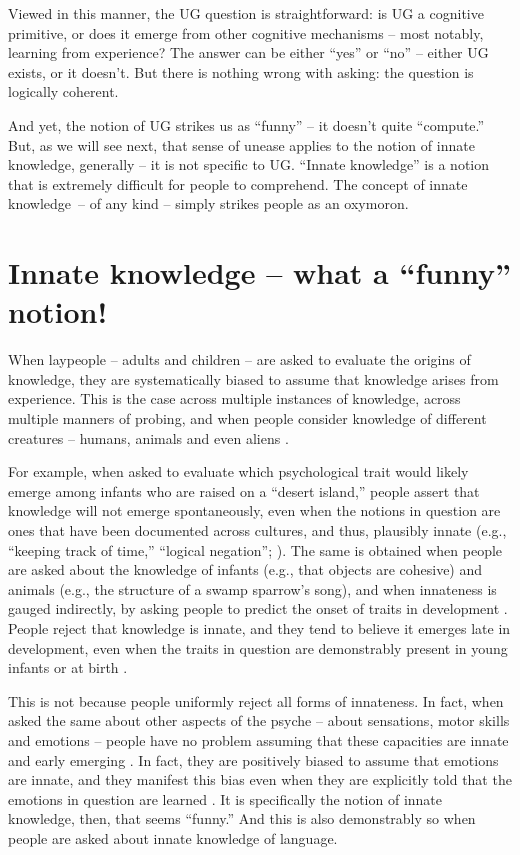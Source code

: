 \documentclass[output=paper,colorlinks,citecolor=brown
]{langscibook}
\begin{document}
Viewed in this manner, the UG question is straightforward: is UG a cognitive primitive, or does it emerge from other cognitive mechanisms -- most notably, learning from experience?
The answer can be either “yes” or “no” -- either UG exists, or it doesn’t. But there is nothing wrong with asking: the question is logically coherent. 

And yet, the notion of UG strikes us as ``funny'' -- it doesn’t quite ``compute.'' But, as we will see next, that sense of unease applies to the notion of innate knowledge, generally -- it is not specific to UG. ``Innate knowledge'' is a notion that is extremely difficult for people to comprehend. The concept of innate knowledge~-- of any kind -- simply strikes people as an oxymoron.

\section{Innate knowledge -- what a “funny” notion!}

When laypeople -- adults and children -- are asked to evaluate the origins of knowledge, they are systematically biased to assume that knowledge arises from experience. This is the case across multiple instances of knowledge, across multiple manners of probing, and when people consider knowledge of different creatures -- humans, animals and even aliens \citep{berent2019people,wang2019empiricism}.

For example, when asked to evaluate which psychological trait would likely emerge among infants who are raised on a “desert island,” people assert that knowledge will not emerge spontaneously, even when the notions in question are ones that have been documented across cultures, and thus, plausibly innate (e.g., “keeping track of time,” “logical negation”; \cite{berent2019people}). The same is obtained when people are asked about the knowledge of infants (e.g., that objects are cohesive) and animals (e.g., the structure of a swamp sparrow’s song), and when innateness is gauged indirectly, by asking people to predict the onset of traits in development \citep{berent2019people}. People reject that knowledge is innate, and they tend to believe it emerges late in development, even when the traits in question are demonstrably present in young infants or at birth \citep{wang2019empiricism}.

This is not because people uniformly reject all forms of innateness. In fact, when asked the same about other aspects of the psyche -- about sensations, motor skills and emotions -- people have no problem assuming that these capacities are innate and early emerging \citep{berent2019people}. In fact, they are positively biased to assume that emotions are innate, and they manifest this bias even when they are explicitly told that the emotions in question are learned \citep{berent2020essentialist}. It is specifically the notion of innate knowledge, then, that seems “funny.” And this is also demonstrably so when people are asked about innate knowledge of language.
\end{document}
